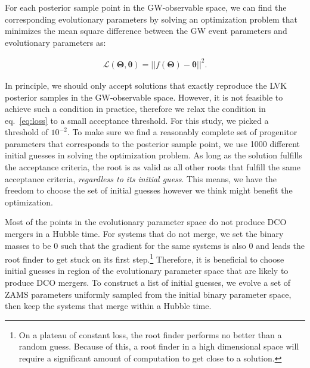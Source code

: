 \documentclass[twocolumn]{aastex631}
\begin{document}
For each posterior sample point in the GW-observable space,
we can find the corresponding evolutionary parameters by solving an optimization problem that minimizes 
the mean square difference between the GW event parameters and evolutionary parameters as:

\begin{align}
\mathcal{L}(\bm{\Theta},\bm{\theta}) = ||f(\bm{\Theta})-\bm{\theta}||^2.
\label{eq:loss}
\end{align}

In principle, we should only accept solutions that exactly reproduce the LVK posterior samples in the GW-observable space.
However, it is not feasible to achieve such a condition in practice, therefore we relax the condition in eq.~\ref{eq:loss} 
to a small acceptance threshold. For this study, we picked a threshold of $10^{-2}$. To make sure we find a reasonably 
complete set of progenitor parameters that corresponds to the posterior sample point, we use 1000 different initial guesses 
in solving the optimization problem. As long as the solution fulfills the acceptance criteria, the root is as valid as all 
other roots that fulfill the same acceptance criteria, \emph{regardless to its initial guess}.
This means, we have the freedom to choose the set of initial guesses however we think might benefit the optimization.

Most of the points in the evolutionary parameter space do not produce DCO mergers in a Hubble time. For systems that do not merge, 
we set the binary masses to be $0$ such that the gradient for the same systems is also $0$ and leads the root finder to get stuck on 
its first step.{\footnote{On a plateau of constant loss, the root finder performs no better than a random guess. 
Because of this, a root finder in a high dimensional space will require a significant amount of computation
to get close to a solution.}} Therefore, it is beneficial to choose initial guesses in region of the evolutionary parameter 
space that are likely to produce DCO mergers. To construct a list of initial guesses, we evolve a set of 
ZAMS parameters uniformly sampled from the initial binary parameter space, then keep the systems that 
merge within a Hubble time.
\end{document}
